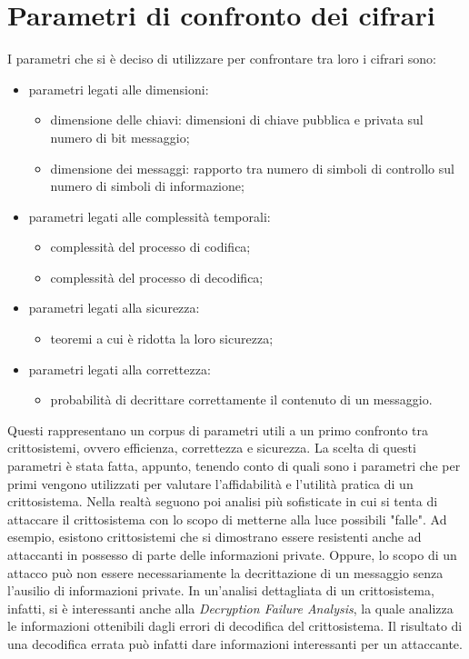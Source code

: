 \documentclass[12pt, a4paper]{report}
\theoremstyle{definition}
\begin{document}
		\section{Parametri di confronto dei cifrari}
			I parametri che si è deciso di utilizzare per confrontare tra loro i cifrari sono:
			\begin{itemize}
				\item parametri legati alle dimensioni:
					\begin{itemize}
						\item dimensione delle chiavi: dimensioni di chiave pubblica e privata sul numero di bit messaggio;
						\item dimensione dei messaggi: rapporto tra numero di simboli di controllo sul numero di simboli di informazione;
					\end{itemize}
				\item parametri legati alle complessità temporali:
					\begin{itemize}
						\item complessità del processo di codifica;
						\item complessità del processo di decodifica;
					\end{itemize}
				\item parametri legati alla sicurezza:
					\begin{itemize}
						\item teoremi a cui è ridotta la loro sicurezza;
					\end{itemize}
				\item parametri legati alla correttezza:
					\begin{itemize}
						\item probabilità di decrittare correttamente il contenuto di un messaggio.
					\end{itemize}
			\end{itemize}
			Questi rappresentano un corpus di parametri utili a un primo confronto tra crittosistemi, ovvero efficienza, correttezza e sicurezza. La scelta di questi parametri è stata fatta, appunto, tenendo conto di quali sono i parametri che per primi vengono utilizzati per valutare l'affidabilità e l'utilità pratica di un crittosistema. Nella realtà seguono poi analisi più sofisticate in cui si tenta di attaccare il crittosistema con lo scopo di metterne alla luce possibili "falle". Ad esempio, esistono crittosistemi che si dimostrano essere resistenti anche ad attaccanti in possesso di parte delle informazioni private. Oppure, lo scopo di un attacco può non essere necessariamente la decrittazione di un messaggio senza l'ausilio di informazioni private. In un'analisi dettagliata di un crittosistema, infatti, si è interessanti anche alla \emph{Decryption Failure Analysis}, la quale analizza le informazioni ottenibili dagli errori di decodifica del crittosistema. Il risultato di una decodifica errata può infatti dare informazioni interessanti per un attaccante.
\end{document}
